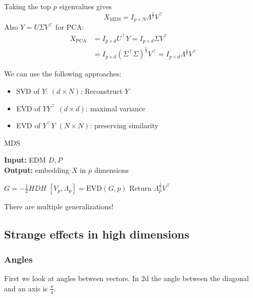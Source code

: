 Taking the top $p$ eigenvalues gives 
\[X_{\text{MDS}}=I_{p\times N}\Lambda^{\frac{1}{2}}V^\intercal\]
Also $Y=U\Sigma V^\intercal$ for PCA:
\begin{align*}
    X_{\text{PCA}}&=I_{p\times d} U^\intercal Y = I_{p\times d} \Sigma V^\intercal\\
    &=I_{p\times d} (\Sigma^\intercal \Sigma)^{\frac{1}{2}}V^\intercal=I_{p\times d}\Lambda^{\frac{1}{2}}V^\intercal
\end{align*}



We can use the following approaches:

\begin{itemize}
    \item SVD of $Y$: $(d\times N)$: Reconstruct $Y$
    \item EVD of $YY^\intercal$ $(d\times d)$: maximal variance 
    \item EVD of $Y^\intercal Y$ $(N\times N)$: preserving similarity 
\end{itemize}


\begin{algorithm}[H] %
    \caption{MDS}\label{alg:mds}
 \textbf{Input:} EDM $D,P$\\
 \textbf{Output:} embedding $X$ in $p$ dimensions
 \begin{algorithmic}
   \State $G=-\frac{1}{2} H D H$
   \State $[V_p,\Lambda_p]=\text{EVD}(G,p)$
   \State Return $\Lambda_p^{\frac{1}{2}} V^\intercal$
 \end{algorithmic}
\end{algorithm}

\begin{aremark}
    There are multiple generalizations!
\end{aremark}

\subsection{Strange effects in high dimensions}

\subsubsection*{Angles}

First we look at angles between vectors. In 2d the angle between the diagonal and an axis is $\frac{\pi}{4}$.

